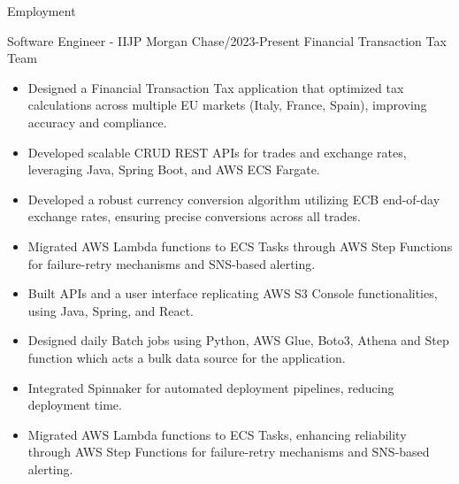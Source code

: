\documentclass[]{mcdowellcv}
\begin{document}
    \begin{cvsection}{Employment}

        \begin{cvsubsection}{Software Engineer - II}{JP Morgan Chase}{/2023-Present}
            Financial Transaction Tax Team
            \begin{itemize}
                \item Designed a Financial Transaction Tax application that optimized tax calculations across multiple EU markets (Italy, France, Spain), improving accuracy and compliance.
                \item Developed scalable CRUD REST APIs for trades and exchange rates, leveraging Java, Spring Boot, and AWS ECS Fargate.
                \item Developed a robust currency conversion algorithm utilizing ECB end-of-day exchange rates, ensuring precise conversions across all trades.
                \item Migrated AWS Lambda functions to ECS Tasks through AWS Step Functions for failure-retry mechanisms and SNS-based alerting.
                \item Built APIs and a user interface replicating AWS S3 Console functionalities, using Java, Spring, and React.
                \item Designed daily Batch jobs using Python, AWS Glue, Boto3, Athena and Step function which acts a bulk data source for the application.
                \item Integrated Spinnaker for automated deployment pipelines, reducing deployment time.
                \item Migrated AWS Lambda functions to ECS Tasks, enhancing reliability through AWS Step Functions for failure-retry mechanisms and SNS-based alerting.


\end{itemize}
\end{cvsubsection}
\end{cvsection}
\end{document}
